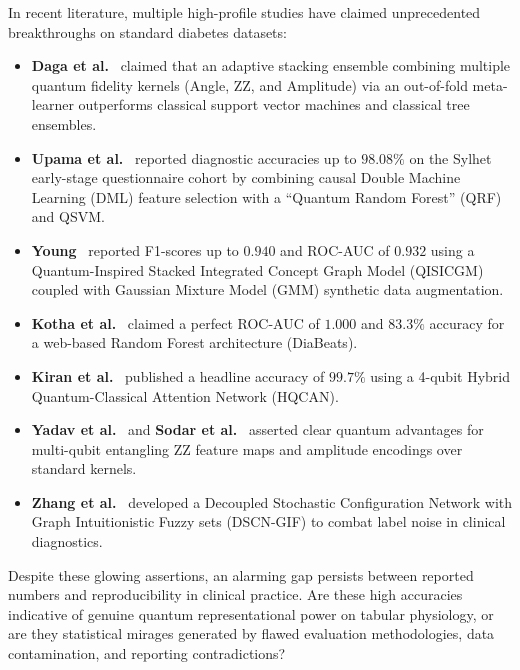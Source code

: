 \documentclass[journal,twocolumn]{IEEEtran}
\begin{document}
In recent literature, multiple high-profile studies have claimed unprecedented breakthroughs on standard diabetes datasets:
\begin{itemize}
    \item \textbf{Daga et al.}~\cite{daga2026adaptive} claimed that an adaptive stacking ensemble combining multiple quantum fidelity kernels (Angle, ZZ, and Amplitude) via an out-of-fold meta-learner outperforms classical support vector machines and classical tree ensembles.
    \item \textbf{Upama et al.}~\cite{upama2026} reported diagnostic accuracies up to $98.08\%$ on the Sylhet early-stage questionnaire cohort by combining causal Double Machine Learning (DML) feature selection with a ``Quantum Random Forest'' (QRF) and QSVM.
    \item \textbf{Young}~\cite{young2025} reported F1-scores up to $0.940$ and ROC-AUC of $0.932$ using a Quantum-Inspired Stacked Integrated Concept Graph Model (QISICGM) coupled with Gaussian Mixture Model (GMM) synthetic data augmentation.
    \item \textbf{Kotha et al.}~\cite{kotha2026} claimed a perfect ROC-AUC of $1.000$ and $83.3\%$ accuracy for a web-based Random Forest architecture (DiaBeats).
    \item \textbf{Kiran et al.}~\cite{kiran2025} published a headline accuracy of $99.7\%$ using a 4-qubit Hybrid Quantum-Classical Attention Network (HQCAN).
    \item \textbf{Yadav et al.}~\cite{yadav2026} and \textbf{Sodar et al.}~\cite{sodar2026} asserted clear quantum advantages for multi-qubit entangling ZZ feature maps and amplitude encodings over standard kernels.
    \item \textbf{Zhang et al.}~\cite{zhang2025} developed a Decoupled Stochastic Configuration Network with Graph Intuitionistic Fuzzy sets (DSCN-GIF) to combat label noise in clinical diagnostics.
\end{itemize}

Despite these glowing assertions, an alarming gap persists between reported numbers and reproducibility in clinical practice. Are these high accuracies indicative of genuine quantum representational power on tabular physiology, or are they statistical mirages generated by flawed evaluation methodologies, data contamination, and reporting contradictions?
\end{document}
